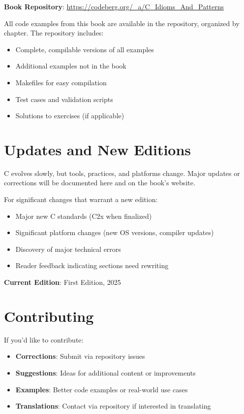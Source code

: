 \documentclass[10pt,openany]{book}
\begin{document}
\textbf{Book Repository}: \url{https://codeberg.org/_a/C_Idioms_And_Patterns}

All code examples from this book are available in the repository, organized by chapter. The repository includes:
\begin{itemize}
    \item Complete, compilable versions of all examples
    \item Additional examples not in the book
    \item Makefiles for easy compilation
    \item Test cases and validation scripts
    \item Solutions to exercises (if applicable)
\end{itemize}

\section*{Updates and New Editions}

C evolves slowly, but tools, practices, and platforms change. Major updates or corrections will be documented here and on the book's website.

For significant changes that warrant a new edition:
\begin{itemize}
    \item Major new C standards (C2x when finalized)
    \item Significant platform changes (new OS versions, compiler updates)
    \item Discovery of major technical errors
    \item Reader feedback indicating sections need rewriting
\end{itemize}

\textbf{Current Edition}: First Edition, 2025

\section*{Contributing}

If you'd like to contribute:
\begin{itemize}
    \item \textbf{Corrections}: Submit via repository issues
    \item \textbf{Suggestions}: Ideas for additional content or improvements
    \item \textbf{Examples}: Better code examples or real-world use cases
    \item \textbf{Translations}: Contact via repository if interested in translating
\end{itemize}
\end{document}

